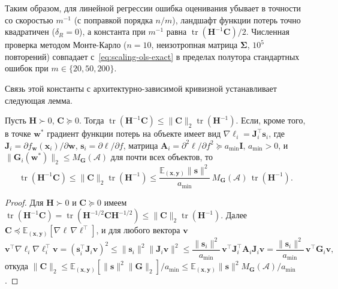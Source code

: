 Таким образом, для линейной регрессии ошибка оценивания убывает в точности со скоростью $m^{-1}$ (с поправкой порядка $n/m$), ландшафт функции потерь точно квадратичен ($\delta_R = 0$), а константа при $m^{-1}$ равна $\operatorname{tr}(\mathbf H^{-1}\mathbf C)/2$. Численная проверка методом Монте-Карло ($n = 10$, неизотропная матрица $\boldsymbol\Sigma$, $10^5$ повторений) совпадает с~\eqref{eq:scaling-ols-exact} в пределах полутора стандартных ошибок при $m \in \{20, 50, 200\}$.

Связь этой константы с архитектурно-зависимой кривизной устанавливает следующая лемма.

\begin{lemma}
    \label{lem:scaling-trace-bound}
    Пусть $\mathbf H \succ 0$, $\mathbf C \succeq 0$. Тогда $\operatorname{tr}(\mathbf H^{-1}\mathbf C) \leqslant \|\mathbf C\|_2 \operatorname{tr}(\mathbf H^{-1})$. Если, кроме того, в точке $\mathbf w^*$ градиент функции потерь на объекте имеет вид $\nabla \ell_i = \mathbf J_i^\top \mathbf s_i$, где $\mathbf J_i = \partial f_{\mathbf w}(\mathbf x_i)/\partial \mathbf w$, $\mathbf s_i = \partial \ell / \partial f$, матрица $\mathbf A_i = \partial^2 \ell / \partial f^2 \succeq a_{\min}\mathbf I$, $a_{\min} > 0$, и $\|\mathbf G_i(\mathbf w^*)\|_2 \leqslant M_{\mathbf G}(\mathcal A)$ для почти всех объектов, то
    \begin{equation}
        \label{eq:scaling-trace-bound}
        \operatorname{tr}(\mathbf H^{-1}\mathbf C)
        \leqslant
        \|\mathbf C\|_2 \operatorname{tr}(\mathbf H^{-1})
        \leqslant
        \frac{\mathbb E_{(\mathbf x, \mathbf y)}\|\mathbf s\|^2}{a_{\min}}\, M_{\mathbf G}(\mathcal A)\, \operatorname{tr}(\mathbf H^{-1}).
    \end{equation}
\end{lemma}

\begin{proof}
    Для $\mathbf H \succ 0$ и $\mathbf C \succeq 0$ имеем $\operatorname{tr}(\mathbf H^{-1}\mathbf C) = \operatorname{tr}(\mathbf H^{-1/2}\mathbf C\mathbf H^{-1/2}) \leqslant \|\mathbf C\|_2 \operatorname{tr}(\mathbf H^{-1})$. Далее $\mathbf C \preceq \mathbb E_{(\mathbf x, \mathbf y)}[\nabla\ell\,\nabla\ell^\top]$, и для любого вектора $\mathbf v$
    \[
        \mathbf v^\top \nabla\ell_i\nabla\ell_i^\top \mathbf v = (\mathbf s_i^\top \mathbf J_i \mathbf v)^2 \leqslant \|\mathbf s_i\|^2 \|\mathbf J_i\mathbf v\|^2 \leqslant \frac{\|\mathbf s_i\|^2}{a_{\min}}\, \mathbf v^\top \mathbf J_i^\top \mathbf A_i \mathbf J_i \mathbf v = \frac{\|\mathbf s_i\|^2}{a_{\min}}\, \mathbf v^\top \mathbf G_i \mathbf v,
    \]
    откуда $\|\mathbf C\|_2 \leqslant \mathbb E_{(\mathbf x, \mathbf y)}[\|\mathbf s\|^2 \|\mathbf G\|_2]/a_{\min} \leqslant \mathbb E_{(\mathbf x, \mathbf y)}\|\mathbf s\|^2 M_{\mathbf G}(\mathcal A)/a_{\min}$.
\end{proof}

